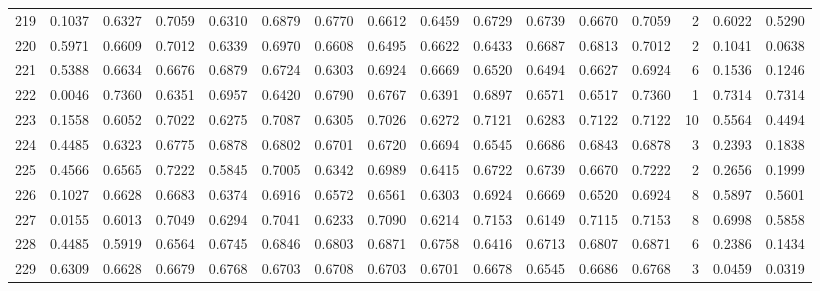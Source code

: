\begin{tabular}{lrrrrrrrrrrrrrrr}
219 &      0.1037 &  0.6327 &  0.7059 &  0.6310 &  0.6879 &  0.6770 &  0.6612 &  0.6459 &  0.6729 &  0.6739 &   0.6670 &     0.7059 &      2 &                    0.6022 &                     0.5290 \\
220 &      0.5971 &  0.6609 &  0.7012 &  0.6339 &  0.6970 &  0.6608 &  0.6495 &  0.6622 &  0.6433 &  0.6687 &   0.6813 &     0.7012 &      2 &                    0.1041 &                     0.0638 \\
221 &      0.5388 &  0.6634 &  0.6676 &  0.6879 &  0.6724 &  0.6303 &  0.6924 &  0.6669 &  0.6520 &  0.6494 &   0.6627 &     0.6924 &      6 &                    0.1536 &                     0.1246 \\
222 &      0.0046 &  0.7360 &  0.6351 &  0.6957 &  0.6420 &  0.6790 &  0.6767 &  0.6391 &  0.6897 &  0.6571 &   0.6517 &     0.7360 &      1 &                    0.7314 &                     0.7314 \\
223 &      0.1558 &  0.6052 &  0.7022 &  0.6275 &  0.7087 &  0.6305 &  0.7026 &  0.6272 &  0.7121 &  0.6283 &   0.7122 &     0.7122 &     10 &                    0.5564 &                     0.4494 \\
224 &      0.4485 &  0.6323 &  0.6775 &  0.6878 &  0.6802 &  0.6701 &  0.6720 &  0.6694 &  0.6545 &  0.6686 &   0.6843 &     0.6878 &      3 &                    0.2393 &                     0.1838 \\
225 &      0.4566 &  0.6565 &  0.7222 &  0.5845 &  0.7005 &  0.6342 &  0.6989 &  0.6415 &  0.6722 &  0.6739 &   0.6670 &     0.7222 &      2 &                    0.2656 &                     0.1999 \\
226 &      0.1027 &  0.6628 &  0.6683 &  0.6374 &  0.6916 &  0.6572 &  0.6561 &  0.6303 &  0.6924 &  0.6669 &   0.6520 &     0.6924 &      8 &                    0.5897 &                     0.5601 \\
227 &      0.0155 &  0.6013 &  0.7049 &  0.6294 &  0.7041 &  0.6233 &  0.7090 &  0.6214 &  0.7153 &  0.6149 &   0.7115 &     0.7153 &      8 &                    0.6998 &                     0.5858 \\
228 &      0.4485 &  0.5919 &  0.6564 &  0.6745 &  0.6846 &  0.6803 &  0.6871 &  0.6758 &  0.6416 &  0.6713 &   0.6807 &     0.6871 &      6 &                    0.2386 &                     0.1434 \\
229 &      0.6309 &  0.6628 &  0.6679 &  0.6768 &  0.6703 &  0.6708 &  0.6703 &  0.6701 &  0.6678 &  0.6545 &   0.6686 &     0.6768 &      3 &                    0.0459 &                     0.0319 \\

\end{tabular}
